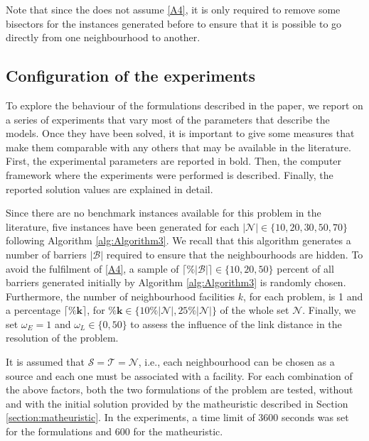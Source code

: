 \documentclass[a4paper,  review, authoryear, 1p.]{elsarticle}
\newcommand{\KMPN}{{\sf{H-KMPN}\xspace }}
\newcommand{\JP}[1]{{\color{blue}#1}}
\newcommand{\CV}[1]{{\color{blue}#1}}
\begin{document}
		
		Note that since the \KMPN does not assume \ref{A4}, it is only required to remove some bisectors for the instances generated before to ensure that it is possible to go directly from one neighbourhood to another.
		

		\subsection{Configuration of the experiments}
		To explore the behaviour of the formulations described in the paper, we report on a series of experiments that vary most of the parameters that describe the models. Once they have been solved, it is important to give some measures that make them comparable with any others that may be available in the literature. First, the experimental parameters are reported \CV{in bold}. Then, the computer framework where the experiments were performed is described. Finally, the reported solution values are explained in detail. 
		
		Since there are no benchmark instances available for this problem in the literature, five instances have been generated for each $\bm{|\mathcal N|}\in\{10, 20, 30, 50, 70\}$ following Algorithm \ref{alg:Algorithm3}. \CV{We recall that this algorithm generates a number of barriers $|\mathcal B|$ required to ensure that the neighbourhoods are hidden. } \JP{To avoid the fulfilment of \ref{A4}, a sample of $\bm{\lceil \% |\mathcal B| \rceil } \in\{10, 20, 50\}$ percent of all barriers generated initially by Algorithm \ref{alg:Algorithm3} is randomly chosen}.  Furthermore, the number of neighbourhood facilities $k$, for each problem, is 1 and a percentage $\bm{\lceil \% k \rceil}$, for $\bm{\% k}\in\{10 \% |\mathcal N|, 25\% |\mathcal N|\}$ of the whole set $\mathcal N$.  Finally, we set \CV{$\omega_E=1$ and $\omega_L\in\{0,50\}$ to assess the influence of the link distance in the resolution of the problem}.
		
		\CV{It is assumed that $\mathcal S=\mathcal T=\mathcal N$, i.e., each neighbourhood can be chosen as a source and each one must be associated with a facility.}
		For each combination of the above factors, both \JP{the two formulations of the problem are tested, without and with the initial solution provided by the matheuristic described in Section \ref{section:matheuristic}. In the experiments, a time limit of 3600 seconds was set for the formulations and 600 for the matheuristic.}
		
\end{document}
